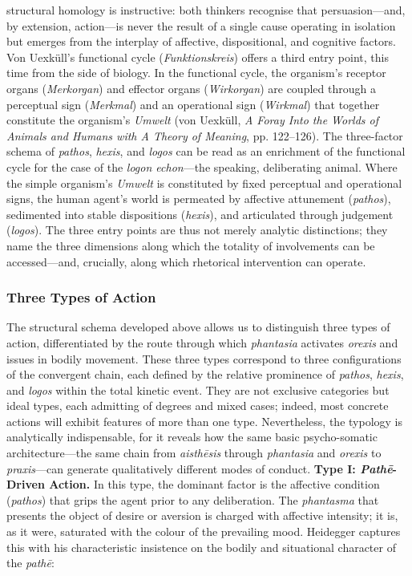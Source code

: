 \documentclass{article}
\begin{document}
structural homology is instructive: both thinkers recognise that persuasion---and, by extension, action---is never the result of a single cause operating in isolation but emerges from the interplay of affective, dispositional, and cognitive factors. Von Uexküll's functional cycle (\textit{Funktionskreis}) offers a third entry point, this time from the side of biology. In the functional cycle, the organism's receptor organs (\textit{Merkorgan}) and effector organs (\textit{Wirkorgan}) are coupled through a perceptual sign (\textit{Merkmal}) and an operational sign (\textit{Wirkmal}) that together constitute the organism's \textit{Umwelt} (von Uexküll, \textit{A Foray Into the Worlds of Animals and Humans with A Theory of Meaning}, pp. 122--126). The three-factor schema of \textit{pathos}, \textit{hexis}, and \textit{logos} can be read as an enrichment of the functional cycle for the case of the \textit{logon echon}---the speaking, deliberating animal. Where the simple organism's \textit{Umwelt} is constituted by fixed perceptual and operational signs, the human agent's world is permeated by affective attunement (\textit{pathos}), sedimented into stable dispositions (\textit{hexis}), and articulated through judgement (\textit{logos}). The three entry points are thus not merely analytic distinctions; they name the three dimensions along which the totality of involvements can be accessed---and, crucially, along which rhetorical intervention can operate. \subsubsection*{Three Types of Action} The structural schema developed above allows us to distinguish three types of action, differentiated by the route through which \textit{phantasia} activates \textit{orexis} and issues in bodily movement. These three types correspond to three configurations of the convergent chain, each defined by the relative prominence of \textit{pathos}, \textit{hexis}, and \textit{logos} within the total kinetic event. They are not exclusive categories but ideal types, each admitting of degrees and mixed cases; indeed, most concrete actions will exhibit features of more than one type. Nevertheless, the typology is analytically indispensable, for it reveals how the same basic psycho-somatic architecture---the same chain from \textit{aisthēsis} through \textit{phantasia} and \textit{orexis} to \textit{praxis}---can generate qualitatively different modes of conduct. \textbf{Type I: \textit{Pathē}-Driven Action.} In this type, the dominant factor is the affective condition (\textit{pathos}) that grips the agent prior to any deliberation. The \textit{phantasma} that presents the object of desire or aversion is charged with affective intensity; it is, as it were, saturated with the colour of the prevailing mood. Heidegger captures this with his characteristic insistence on the bodily and situational character of the \textit{pathē}: \begin{quote}

\end{quote}
\end{document}
